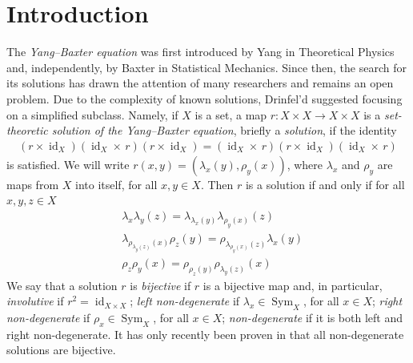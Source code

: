 \documentclass[11pt]{amsart}
\newcommand{\Sym}{\operatorname{Sym}}
\newcommand{\id}{\operatorname{id}}
\theoremstyle{definition}
\begin{document}
\section*{Introduction} 
The \emph{Yang--Baxter equation} was first introduced by Yang \cite{Ya67} in Theoretical Physics and, independently, by Baxter \cite{Ba72} in Statistical Mechanics. Since then, the search for its solutions has drawn the attention of many researchers and remains an open problem. Due to the complexity of known solutions, Drinfel'd \cite{Dr92} suggested focusing on a simplified subclass. Namely, if $X$ is a set, a map
$r:X\times X\to X\times X$ is a \emph{set-theoretic solution of the Yang--Baxter equation}, briefly a \emph{solution}, if the identity
\begin{align}\tag{YBE}\label{YBE}
\left(r\times\id_X\right)
\left(\id_X\times \, r\right)
\left(r\times\id_X\right)
= 
\left(\id_X\times \, r\right)
\left(r\times\id_X\right)
\left(\id_X\times \, r\right)
\end{align}
is satisfied. We will write $r\left(x, y\right) = \left(\lambda_{x}\left(y\right), \rho_{y}\left(x\right)\right)$, where $\lambda_{x}$ and $\rho_{y}$ are maps from $X$ into itself, for all $x,y\in X$. Then
$r$ is a solution if and only if for all $x,y,z \in X$
    \begin{align}
     &\label{first} \lambda_x\lambda_y(z)=\lambda_{\lambda_x\left(y\right)}\lambda_{\rho_y\left(x\right)}\left(z\right)\tag{Y1}\\
    &  \label{second}\lambda_{\rho_{\lambda_y\left(z\right)}\left(x\right)}\rho_z\left(y\right)=\rho_{\lambda_{\rho_y\left(x\right)}\left(z\right)}\lambda_x\left(y\right)\tag{Y2}\\
      &\label{third}\rho_z\rho_y(x)=\rho_{\rho_z\left(y\right)}\rho_{\lambda_y\left(z\right)}\left(x\right)\tag{Y3}
  \end{align} 
We say that a solution $r$ is \textit{bijective} if $r$ is a bijective map and, in particular, \textit{involutive} if $r^2=\id_{X\times X}$; 
\textit{left non-degenerate} if $\lambda_x \in \Sym_X$, for all $x \in X$; 
\textit{right non-degenerate} if $\rho_x \in \Sym_X$, for all $x \in X$; \emph{non-degenerate} if it is both left and right non-degenerate. It has only recently been proven in \cite{JePi25} that all non-degenerate solutions are bijective.
\end{document}
